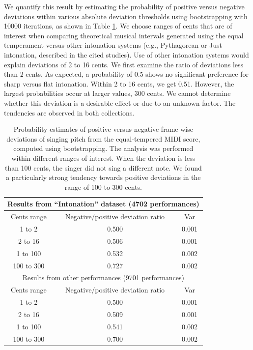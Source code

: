 \begin{appendices}
We quantify this result by estimating the probability of positive versus negative deviations within various absolute deviation thresholds using bootstrapping \cite{efron1994introduction} with 10000 iterations, as shown in Table \ref{table:1}. We choose ranges of cents that are of interest when comparing theoretical musical intervals generated using the equal temperament versus other intonation systems (e.g., Pythagorean or Just intonation, described in the cited studies). Use of other intonation systems would explain deviations of 2 to 16 cents. We first examine the ratio of deviations less than 2 cents. As expected, a probability of 0.5 shows no significant preference for sharp versus flat intonation. Within 2 to 16 cents, we get 0.51. However, the largest probabilities occur at larger values, 300 cents. We cannot determine whether this deviation is a desirable effect or due to an unknown factor. The tendencies are observed in both collections. 


\begin{table}[t!]
\centering
\begin{tabular}{ |c|c|c| } 
\hline
\multicolumn{3}{|c|}{Results from ``Intonation'' dataset (4702 performances)}\\
\hline\hline
Cents range & Negative/positive deviation ratio & Var \\
\hline
1 to 2 & 0.500 & 0.001 \\ 
2 to 16 & 0.506 & 0.001 \\ 
1 to 100 & 0.532 & 0.002\\ 
100 to 300 & 0.727 & 0.002\\ 
\hline\hline
\multicolumn{3}{|c|}{Results from other performances (9701 performances)}\\
\hline\hline
Cents range & Negative/positive deviation ratio & Var \\
\hline
1 to 2 & 0.500 & 0.001 \\ 
2 to 16 & 0.509 & 0.001 \\ 
1 to 100 & 0.541 & 0.002\\ 
100 to 300 & 0.700 & 0.002\\ 
\hline
\end{tabular}
\caption{Probability estimates of positive versus negative frame-wise deviations of singing pitch from the equal-tempered MIDI score, computed using bootstrapping. The analysis was performed within different ranges of interest. When the deviation is less than 100 cents, the singer did not sing a different note. We found a particularly strong tendency towards positive deviations in the range of 100 to 300 cents.}
\label{table:1}
\end{table}


\end{appendices}
